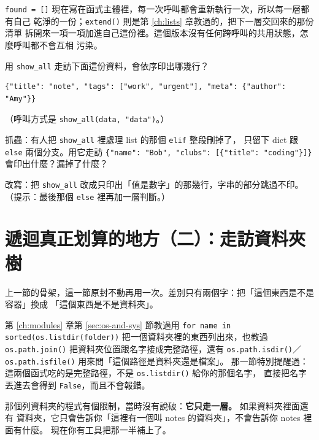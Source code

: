 \iosample{}{[92, 78] \\{} [65] \\{} [1, 2, 3, 4] \\}

\texttt{found = []} 現在寫在函式主體裡，每一次呼叫都會重新執行一次，所以每一層都有自己
乾淨的一份；\texttt{extend()} 則是第 \ref{ch:lists} 章教過的，把下一層交回來的那份清單
拆開來一項一項加進自己這份裡。這個版本沒有任何跨呼叫的共用狀態，怎麼呼叫都不會互相
污染。

\begin{drills}[label=drills:nested-data-walk]
\item 用 \texttt{show\_all} 走訪下面這份資料，會依序印出哪幾行？
\begin{verbatim}
{"title": "note", "tags": ["work", "urgent"], "meta": {"author": "Amy"}}
\end{verbatim}
（呼叫方式是 \texttt{show\_all(data, "data")}。）
\item 抓蟲：有人把 \texttt{show\_all} 裡處理 list 的那個 \texttt{elif} 整段刪掉了，
只留下 dict 跟 \texttt{else} 兩個分支。用它走訪
\texttt{\{"name": "Bob", "clubs": [\{"title": "coding"\}]\}} 會印出什麼？漏掉了什麼？
\item 改寫：把 \texttt{show\_all} 改成只印出「值是數字」的那幾行，字串的部分跳過不印。
（提示：最後那個 \texttt{else} 裡再加一層判斷。）
\end{drills}

\section{遞迴真正划算的地方（二）：走訪資料夾樹}
\label{sec:folder-tree}

上一節的骨架，這一節原封不動再用一次。差別只有兩個字：把「這個東西是不是容器」換成
「這個東西是不是資料夾」。

第 \ref{ch:modules} 章第 \ref{sec:os-and-sys} 節教過用
\texttt{for name in sorted(os.listdir(folder))} 把一個資料夾裡的東西列出來，也教過
\texttt{os.path.join()} 把資料夾位置跟名字接成完整路徑，還有
\texttt{os.path.isdir()}／\texttt{os.path.isfile()} 用來問「這個路徑是資料夾還是檔案」。
那一節特別提醒過：這兩個函式吃的是完整路徑，不是 \texttt{os.listdir()} 給你的那個名字，
直接把名字丟進去會得到 \texttt{False}，而且不會報錯。

那個列資料夾的程式有個限制，當時沒有說破：\textbf{它只走一層。} 如果資料夾裡面還有
資料夾，它只會告訴你「這裡有一個叫 notes 的資料夾」，不會告訴你 notes 裡面有什麼。
現在你有工具把那一半補上了。

